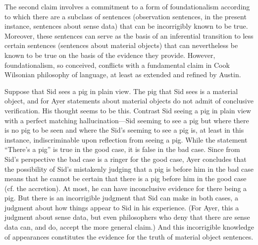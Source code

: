 The second claim involves a commitment to a form of foundationalism according to which there are a subclass of sentences (observation sentences, in the present instance, sentences about sense data) that can be incorrigibly known to be true. Moreover, these sentences can serve as the basis of an inferential transition to less certain sentences (sentences about material objects) that can nevertheless be known to be true on the basis of the evidence they provide. However, foundationalism, so conceived, conflicts with a fundamental claim in Cook Wilsonian philosophy of language, at least as extended and refined by Austin. 

Suppose that Sid sees a pig in plain view. The pig that Sid sees is a material object, and for Ayer statements about material objects do not admit of conclusive verification. His thought seems to be this. Contrast Sid seeing a pig in plain view with a perfect matching hallucination---Sid seeming to see a pig but where there is no pig to be seen and where the Sid's seeming to see a pig is, at least in this instance, indiscriminable upon reflection from seeing a pig. While the statement ``There's a pig'' is true in the good case, it is false in the bad case. Since from Sid's perspective the bad case is a ringer for the good case, Ayer concludes that the possibility of Sid's mistakenly judging that a pig is before him in the bad case means that he cannot be certain that there is a pig before him in the good case (cf. the accretion). At most, he can have inconclusive evidence for there being a pig. But there is an incorrigible judgment that Sid can make in both cases, a judgment about how things appear to Sid in his experience. (For Ayer, this a judgment about sense data, but even philosophers who deny that there are sense data can, and do, accept the more general claim.) And this incorrigible knowledge of appearances constitutes the evidence for the truth of material object sentences.

